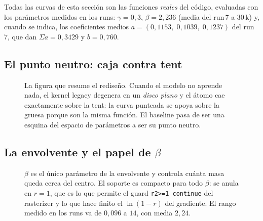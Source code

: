 \documentclass[12pt]{extarticle}
\newcommand{\figcap}[1]{\caption{\small #1}}
\newcommand{\ssum}{\Sigma a}
\newcommand{\code}[1]{\texttt{#1}}
\begin{document}
Todas las curvas de esta sección son las funciones \emph{reales} del código,
evaluadas con los parámetros medidos en los runs: $\gamma=0{,}3$,
$\beta=2{,}236$ (media del run\,7 a 30\,k) y, cuando se indica, los
coeficientes medios $a=(0{,}1153,\;0{,}1039,\;0{,}1237)$ del run\,7, que dan
$\ssum=0{,}3429$ y $b=0{,}760$.

\subsection{El punto neutro: caja contra tent}

\begin{figure}[H]\centering
{}
\figcap{La figura que resume el rediseño. Cuando el modelo no aprende nada, el
kernel legacy degenera en un \emph{disco plano} y el átomo cae exactamente
sobre la tent: la curva punteada se apoya sobre la gruesa porque son la misma
función. El baseline pasa de ser una esquina del espacio de parámetros a ser su
punto neutro.}
\end{figure}

\subsection{La envolvente y el papel de $\beta$}

\begin{figure}[H]\centering
{}
\figcap{$\beta$ es el único parámetro de la envolvente y controla cuánta masa
queda cerca del centro. El soporte es compacto para todo $\beta$: se anula en
$r=1$, que es lo que permite el guard \code{r2>=1 continue} del rasterizer y
lo que hace finito el $\ln(1-r)$ del gradiente. El rango medido en los runs va
de $0{,}096$ a $14$, con media $2{,}24$.}
\label{fig:envolvente}
\end{figure}
\end{document}
